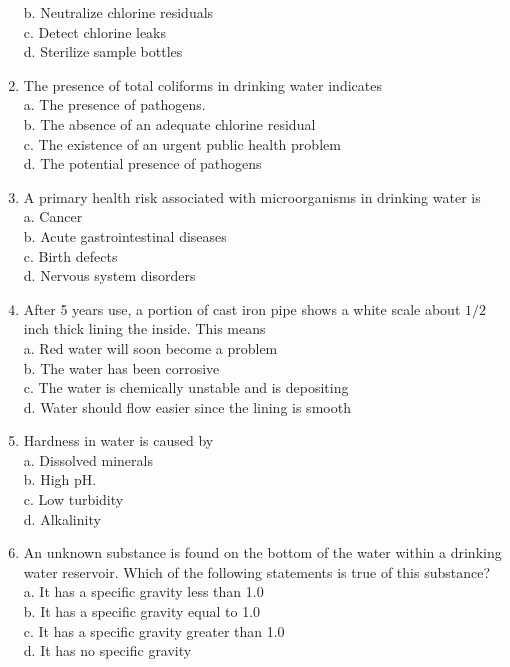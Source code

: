 \begin{enumerate}[1.]
b. Neutralize chlorine residuals\\
c. Detect chlorine leaks\\
d. Sterilize sample bottles\\
\item The presence of total coliforms in drinking water indicates\\
a. The presence of pathogens.\\
b. The absence of an adequate chlorine residual\\
c. The existence of an urgent public health problem\\
d. The potential presence of pathogens\\
\item A primary health risk associated with microorganisms in drinking water is\\
a. Cancer\\
b. Acute gastrointestinal diseases\\
c. Birth defects\\
d. Nervous system disorders\\
\item After 5 years use, a portion of cast iron pipe shows a white scale about $1 / 2$ inch thick lining the inside. This means\\
a. Red water will soon become a problem\\
b. The water has been corrosive\\
c. The water is chemically unstable and is depositing\\
d. Water should flow easier since the lining is smooth\\
\item Hardness in water is caused by\\
a. Dissolved minerals\\
b. High $\mathrm{pH}$.\\
c. Low turbidity\\
d. Alkalinity\\
\item An unknown substance is found on the bottom of the water within a drinking water reservoir. Which of the following statements is true of this substance?\\
a. It has a specific gravity less than 1.0\\
b. It has a specific gravity equal to 1.0\\
c. It has a specific gravity greater than 1.0\\
d. It has no specific gravity\\

\end{enumerate}
